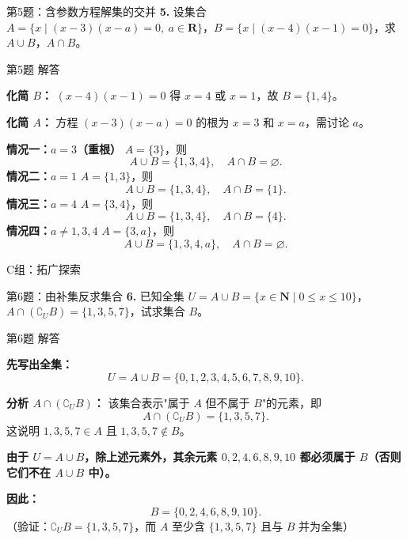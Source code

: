 \documentclass[10pt,aspectratio=169,serif]{beamer}
\begin{document}
\begin{frame}[t]{第5题：含参数方程解集的交并}
\textbf{5.} 设集合 $A = \{x \mid (x-3)(x-a)=0,\ a\in\mathbf{R}\}$，$B = \{x \mid (x-4)(x-1)=0\}$，求 $A \cup B$，$A \cap B$。
\end{frame}

\begin{frame}[t]{第5题 解答}
\begin{tcolorbox}[colback=orange!10,colframe=orange,title=\textbf{解}]
\textbf{化简 $B$：} $(x-4)(x-1)=0$ 得 $x=4$ 或 $x=1$，故 $B=\{1,4\}$。

\textbf{化简 $A$：} 方程 $(x-3)(x-a)=0$ 的根为 $x=3$ 和 $x=a$，需讨论 $a$。

\textbf{情况一：$a=3$（重根）} $A=\{3\}$，则
\[
A\cup B=\{1,3,4\},\quad A\cap B=\varnothing.
\]
\textbf{情况二：$a=1$} $A=\{1,3\}$，则
\[
A\cup B=\{1,3,4\},\quad A\cap B=\{1\}.
\]
\textbf{情况三：$a=4$} $A=\{3,4\}$，则
\[
A\cup B=\{1,3,4\},\quad A\cap B=\{4\}.
\]
\textbf{情况四：$a\neq 1,3,4$} $A=\{3,a\}$，则
\[
A\cup B=\{1,3,4,a\},\quad A\cap B=\varnothing.
\]
\end{tcolorbox}
\end{frame}

\begin{frame}[t]{C组：拓广探索}
\end{frame}

\begin{frame}[t]{第6题：由补集反求集合}
\textbf{6.} 已知全集 $U = A \cup B = \{x \in \mathbf{N} \mid 0 \le x \le 10\}$，$A \cap (\complement_U B) = \{1, 3, 5, 7\}$，试求集合 $B$。
\end{frame}

\begin{frame}[t]{第6题 解答}
\begin{tcolorbox}[colback=orange!10,colframe=orange,title=\textbf{解}]
\textbf{先写出全集：}
\[
U = A\cup B = \{0,1,2,3,4,5,6,7,8,9,10\}.
\]

\textbf{分析 $A\cap(\complement_U B)$：} 该集合表示"属于 $A$ 但\alert{不属于} $B$"的元素，即
\[
A\cap(\complement_U B) = \{1,3,5,7\}.
\]
这说明 $1,3,5,7 \in A$ 且 $1,3,5,7 \notin B$。

\textbf{由于 $U = A\cup B$，除上述元素外，其余元素 $0,2,4,6,8,9,10$ 都必须属于 $B$（否则它们不在 $A\cup B$ 中）。}

\textbf{因此：}
\[
B = \{0,2,4,6,8,9,10\}.
\]
\vspace{0.5em}
\small（验证：$\complement_U B = \{1,3,5,7\}$，而 $A$ 至少含 $\{1,3,5,7\}$ 且与 $B$ 并为全集）
\end{tcolorbox}
\end{frame}
\end{document}
